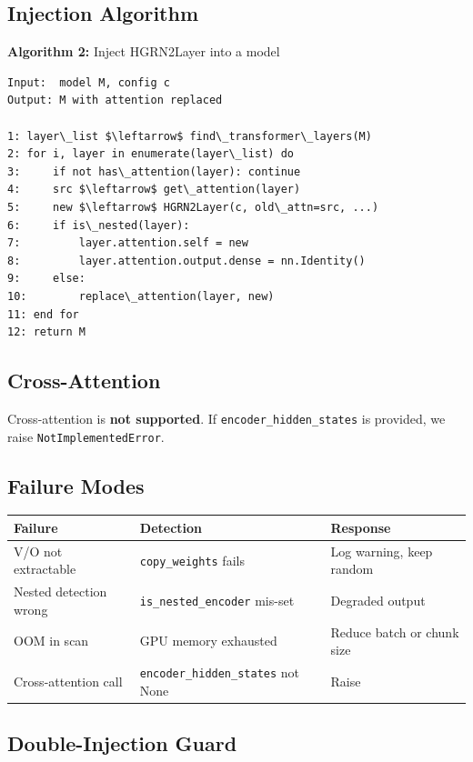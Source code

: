 \subsection{Injection Algorithm}

\textbf{Algorithm 2:} Inject HGRN2Layer into a model
\begin{lstlisting}
Input:  model M, config c
Output: M with attention replaced

1: layer\_list $\leftarrow$ find\_transformer\_layers(M)
2: for i, layer in enumerate(layer\_list) do
3:     if not has\_attention(layer): continue
4:     src $\leftarrow$ get\_attention(layer)
5:     new $\leftarrow$ HGRN2Layer(c, old\_attn=src, ...)
6:     if is\_nested(layer):
7:         layer.attention.self = new
8:         layer.attention.output.dense = nn.Identity()
9:     else:
10:        replace\_attention(layer, new)
11: end for
12: return M
\end{lstlisting}

\subsection{Cross-Attention}

Cross-attention is \textbf{not supported}. If \texttt{encoder\_hidden\_states} is provided, 
we raise \texttt{NotImplementedError}.

\subsection{Failure Modes}

\begin{table}[H]
\centering
\small
\begin{tabular}{lll}
\toprule
\textbf{Failure} & \textbf{Detection} & \textbf{Response} \\
\midrule
V/O not extractable & \texttt{copy\_weights} fails & Log warning, keep random \\
Nested detection wrong & \texttt{is\_nested\_encoder} mis-set & Degraded output \\
OOM in scan & GPU memory exhausted & Reduce batch or chunk size \\
Cross-attention call & \texttt{encoder\_hidden\_states} not None & Raise \\
\bottomrule
\end{tabular}
\end{table}

\subsection{Double-Injection Guard}


